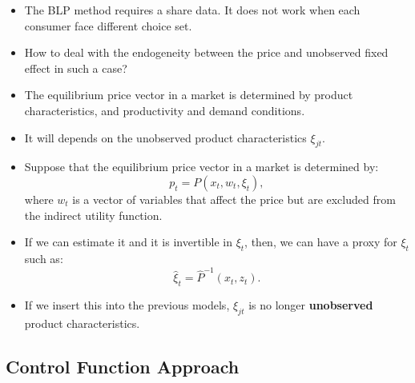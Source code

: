 \documentclass[
]{book}
\providecommand{\tightlist}{%
  \setlength{\itemsep}{0pt}\setlength{\parskip}{0pt}}
\begin{document}
\begin{itemize}
\tightlist
\item
  The BLP method requires a share data. It does not work when each consumer face different choice set.
\item
  How to deal with the endogeneity between the price and unobserved fixed effect in such a case?
\item
  The equilibrium price vector in a market is determined by product characteristics, and productivity and demand conditions.
\item
  It will depends on the unobserved product characteristics \(\xi_{jt}\).
\item
  Suppose that the equilibrium price vector in a market is determined by:
  \begin{equation}
  p_{t} = P(x_t, w_t, \xi_t),
  \end{equation}
  where \(w_t\) is a vector of variables that affect the price but are excluded from the indirect utility function.
\item
  If we can estimate it and it is invertible in \(\xi_t\), then, we can have a proxy for \(\xi_t\) such as:
  \begin{equation}
  \hat{\xi}_t = \hat{P}^{-1}(x_t, z_t).
  \end{equation}
\item
  If we insert this into the previous models, \(\xi_{jt}\) is no longer \textbf{unobserved} product characteristics.
\end{itemize}

\hypertarget{control-function-approach-1}{%
\subsection{Control Function Approach}\label{control-function-approach-1}}
\end{document}

